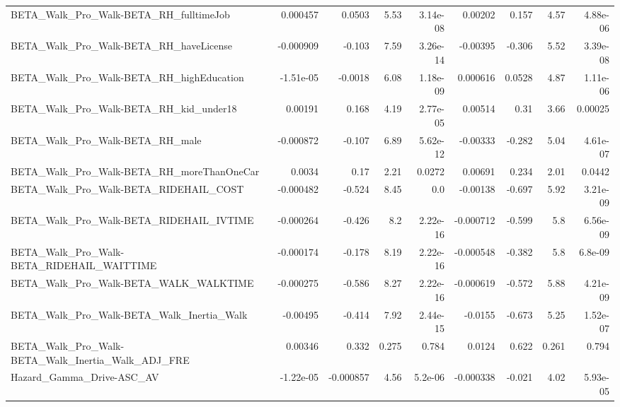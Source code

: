 \begin{tabular}{lrrrrrrrr}
BETA\_Walk\_Pro\_Walk-BETA\_RH\_fulltimeJob             &    0.000457 &       0.0503 &     5.53 & 3.14e-08 &    0.00202 &       0.157 &         4.57 &      4.88e-06 \\
BETA\_Walk\_Pro\_Walk-BETA\_RH\_haveLicense             &   -0.000909 &       -0.103 &     7.59 & 3.26e-14 &   -0.00395 &      -0.306 &         5.52 &      3.39e-08 \\
BETA\_Walk\_Pro\_Walk-BETA\_RH\_highEducation           &   -1.51e-05 &      -0.0018 &     6.08 & 1.18e-09 &   0.000616 &      0.0528 &         4.87 &      1.11e-06 \\
BETA\_Walk\_Pro\_Walk-BETA\_RH\_kid\_under18             &     0.00191 &        0.168 &     4.19 & 2.77e-05 &    0.00514 &        0.31 &         3.66 &       0.00025 \\
BETA\_Walk\_Pro\_Walk-BETA\_RH\_male                    &   -0.000872 &       -0.107 &     6.89 & 5.62e-12 &   -0.00333 &      -0.282 &         5.04 &      4.61e-07 \\
BETA\_Walk\_Pro\_Walk-BETA\_RH\_moreThanOneCar          &      0.0034 &         0.17 &     2.21 &   0.0272 &    0.00691 &       0.234 &         2.01 &        0.0442 \\
BETA\_Walk\_Pro\_Walk-BETA\_RIDEHAIL\_COST              &   -0.000482 &       -0.524 &     8.45 &      0.0 &   -0.00138 &      -0.697 &         5.92 &      3.21e-09 \\
BETA\_Walk\_Pro\_Walk-BETA\_RIDEHAIL\_IVTIME            &   -0.000264 &       -0.426 &      8.2 & 2.22e-16 &  -0.000712 &      -0.599 &          5.8 &      6.56e-09 \\
BETA\_Walk\_Pro\_Walk-BETA\_RIDEHAIL\_WAITTIME          &   -0.000174 &       -0.178 &     8.19 & 2.22e-16 &  -0.000548 &      -0.382 &          5.8 &       6.8e-09 \\
BETA\_Walk\_Pro\_Walk-BETA\_WALK\_WALKTIME              &   -0.000275 &       -0.586 &     8.27 & 2.22e-16 &  -0.000619 &      -0.572 &         5.88 &      4.21e-09 \\
BETA\_Walk\_Pro\_Walk-BETA\_Walk\_Inertia\_Walk          &    -0.00495 &       -0.414 &     7.92 & 2.44e-15 &    -0.0155 &      -0.673 &         5.25 &      1.52e-07 \\
BETA\_Walk\_Pro\_Walk-BETA\_Walk\_Inertia\_Walk\_ADJ\_FRE  &     0.00346 &        0.332 &    0.275 &    0.784 &     0.0124 &       0.622 &        0.261 &         0.794 \\
Hazard\_Gamma\_Drive-ASC\_AV                          &   -1.22e-05 &    -0.000857 &     4.56 &  5.2e-06 &  -0.000338 &      -0.021 &         4.02 &      5.93e-05 \\

\end{tabular}
